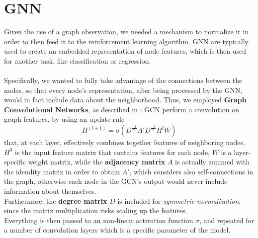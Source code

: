 \section{GNN}
Given the use of a graph observation, we needed a mechanism to normalize it in order to then feed it to the reinforcement learning algorithm. GNN are typically used to create an embedded representation of node features, which is then used for another task, like classification or regression. \\ \\

\noindent
Specifically, we wanted to fully take advantage of the connections between the nodes, so that every node's representation, after being processed by the GNN, would in fact include data about the neighborhood. Thus, we employed \textbf{Graph Convolutional Networks}, as described in \cite{gcn}: GCN perform a convolution on graph features, by using an update rule 
$$H^{(l + 1)} = \sigma(D^{\frac{-1}{2}} A' D^{\frac{-1}{2}} H^{l} W )$$ that, at each layer, effectively combines together features of neighboring nodes.\\ $H^0$ is the input feature matrix that contains features for each node, $W$ is a layer-specific weight matrix, while the \textbf{adjacency matrix} $A$ is actually summed with the idendity matrix in order to obtain $A'$, which considers also self-connections in the graph, otherwise each node in the GCN's output would never include information about themselves. \\
Furthermore, the \textbf{degree matrix} $D$ is included for \textit{symmetric normalization}, since the matrix multiplication risks scaling up the features.\\
Everything is then passed to an non-linear activation function $\sigma$, and repeated for a number of convolution layers which is a specific parameter of the model.\\ \\

